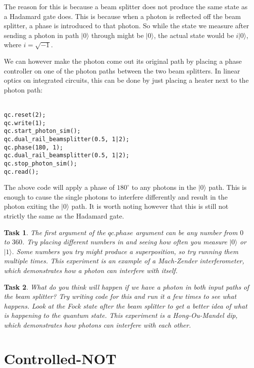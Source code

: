 \documentclass[twocolumn]{article}
\newtheorem{task}{Task}[section]
\begin{document}
The reason for this is because a beam splitter does not produce the same state as a Hadamard gate does. This is because when a photon is reflected off the beam splitter, a phase is introduced to that photon. So while the state we measure after sending a photon in path $|0\rangle$ through might be $|0\rangle$, the actual state would be $i|0\rangle$, where $i = \sqrt{-1}$.

We can however make the photon come out its original path by placing a phase controller on one of the photon paths between the two beam splitters. In linear optics on integrated circuits, this can be done by just placing a heater next to the photon path:
\\\\
\begin{lstlisting}
qc.reset(2);
qc.write(1);
qc.start_photon_sim();
qc.dual_rail_beamsplitter(0.5, 1|2);
qc.phase(180, 1);
qc.dual_rail_beamsplitter(0.5, 1|2);
qc.stop_photon_sim();
qc.read();
\end{lstlisting}

The above code will apply a phase of $180^\circ$ to any photons in the $|0\rangle$ path. This is enough to cause the single photons to interfere differently and result in the photon exiting the $|0\rangle$ path. It is worth noting however that this is still not strictly the same as the Hadamard gate.

\begin{task}
The first argument of the $qc.phase$ argument can be any number from $0$ to $360$. Try placing different numbers in and seeing how often you measure $|0\rangle$ or $|1\rangle$. Some numbers you try might produce a superposition, so try running them multiple times. This experiment is an example of a Mach-Zender interferometer, which demonstrates how a photon can interfere with itself.
\end{task}

\begin{task}
What do you think will happen if we have a photon in both input paths of the beam splitter? Try writing code for this and run it a few times to see what happens. Look at the Fock state after the beam splitter to get a better idea of what is happening to the quantum state. This experiment is a Hong-Ou-Mandel dip, which demonstrates how photons can interfere with each other.
\end{task}

\section{Controlled-NOT}
\end{document}
